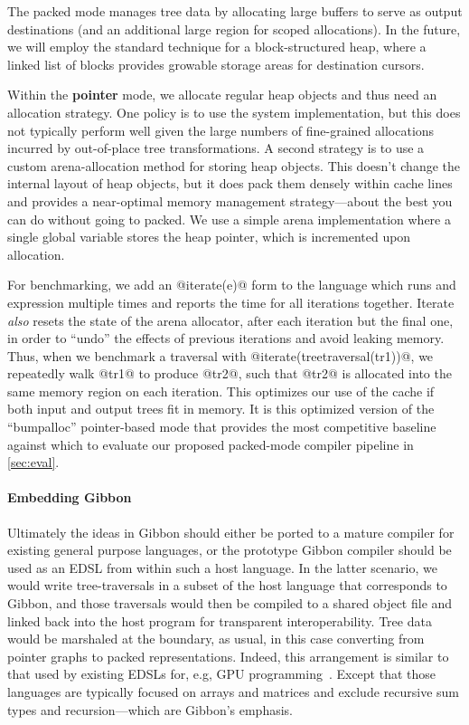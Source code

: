 \documentclass[a4paper,english]{lipics-v2016}
\newcommand{\treelang}{Gibbon\xspace} %
\begin{document}
The packed mode manages tree data by allocating large buffers to serve as output
destinations (and an additional large region for scoped allocations).  In the
future, we will employ the standard technique for a block-structured heap, where a
linked list of blocks provides growable storage areas for destination cursors.


Within the {\bf pointer} mode, we allocate regular heap objects and thus need an
allocation strategy.  One policy is to use the system 
implementation, but this does not typically perform well given the large numbers
of fine-grained allocations incurred by out-of-place tree transformations.
%
A second strategy is to use a custom arena-allocation method for storing heap
objects.  This doesn't change the internal layout of heap objects, but it does
pack them densely within cache lines and provides a near-optimal memory
management strategy---about the best you can do without going to packed.
%
We use a simple arena implementation where a single global variable stores the
heap pointer, which is incremented upon allocation.

For benchmarking, we add an @iterate(e)@ form to the language which runs and
expression multiple times and reports the time for all iterations together.
Iterate {\em also} resets the state of the arena allocator, after each iteration
but the final one, in order to ``undo'' the effects of previous iterations
and avoid leaking memory.
%
Thus, when we benchmark a traversal with @iterate(treetraversal(tr1))@, we
repeatedly walk @tr1@ to produce @tr2@, such that @tr2@ is allocated into the
same memory region on each iteration.  This optimizes our use of the cache if
both input and output trees fit in memory.
%
It is this optimized version of the ``bumpalloc'' pointer-based mode that
provides the most competitive baseline against which to evaluate our proposed
packed-mode compiler pipeline in \cref{sec:eval}.


\paragraph*{Embedding Gibbon}

Ultimately the ideas in Gibbon should either be ported to a mature compiler for
existing general purpose languages, or the prototype Gibbon compiler should be
used as an EDSL from within such a host language.
%
In the latter scenario, we would write tree-traversals in a subset of the host
language that corresponds to Gibbon, and those traversals would then be compiled
to a shared object file and linked back into the host program for transparent
interoperability.  Tree data would be marshaled at the boundary, as usual, in
this case converting from pointer graphs to packed representations.
%
Indeed, this arrangement is similar to that used by existing EDSLs for, e.g, GPU
programming~\cite{accelerate,delite,obsidian}.  Except that those languages are
typically focused on arrays and matrices and exclude recursive sum types and
recursion---which are \treelang's emphasis.
\end{document}
